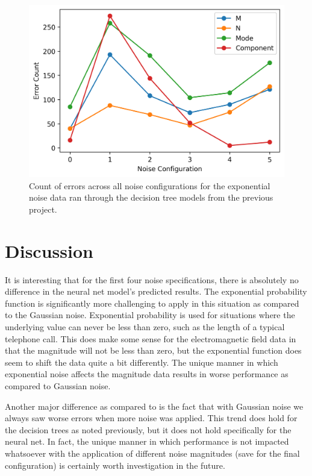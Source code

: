\documentclass[conference]{IEEEtran}
\begin{document}
\begin{figure}
	\centering
	\includegraphics[width=1\linewidth]{images/error_count_dt_prior_model}
	\caption{Count of errors across all noise configurations for the exponential noise data ran through the decision tree models from the previous project.}
	\label{fig:error_count_dt_prior_model}
\end{figure}

\section{Discussion}

It is interesting that for the first four noise specifications, there is absolutely no difference in the neural net model's predicted results.
The exponential probability function is significantly more challenging to apply in this situation as compared to the Gaussian noise. 
Exponential probability is used for situations where the underlying value can never be less than zero, such as the length of a typical telephone call\cite{yates_probability_2014}. 
This does make some sense for the electromagnetic field data in that the magnitude will not be less than zero, but the exponential function does seem to shift the data quite a bit differently.
The unique manner in which exponential noise affects the magnitude data results in worse performance as compared to Gaussian noise.

Another major difference as compared to \cite{newberry_machine_2022-1} is the fact that with Gaussian noise we always saw worse errors when more noise was applied.
This trend does hold for the decision trees as noted previously, but it does not hold specifically for the neural net.
In fact, the unique manner in which performance is not impacted whatsoever with the application of different noise magnitudes (save for the final configuration) is certainly worth investigation in the future.
\end{document}
